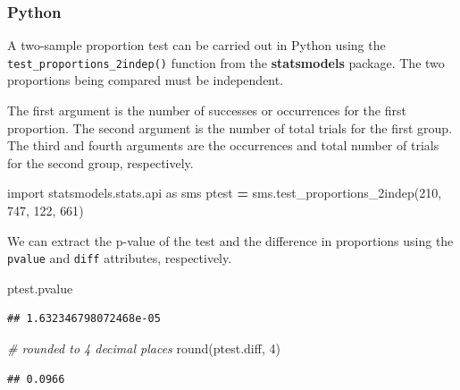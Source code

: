 \documentclass[
]{book}
\newenvironment{Shaded}{\begin{snugshade}}{\end{snugshade}}
\newcommand{\BuiltInTok}[1]{#1}
\newcommand{\CommentTok}[1]{\textcolor[rgb]{0.56,0.35,0.01}{\textit{#1}}}
\newcommand{\DecValTok}[1]{\textcolor[rgb]{0.00,0.00,0.81}{#1}}
\newcommand{\ImportTok}[1]{#1}
\newcommand{\NormalTok}[1]{#1}
\newcommand{\OperatorTok}[1]{\textcolor[rgb]{0.81,0.36,0.00}{\textbf{#1}}}
\begin{document}
\hypertarget{python-48}{%
\subsubsection*{Python}\label{python-48}}

A two-sample proportion test can be carried out in Python using the \texttt{test\_proportions\_2indep()} function from the \textbf{statsmodels} package. The two proportions being compared must be independent.

The first argument is the number of successes or occurrences for the first proportion. The second argument is the number of total trials for the first group. The third and fourth arguments are the occurrences and total number of trials for the second group, respectively.

\begin{Shaded}
\begin{Highlighting}[]
\ImportTok{import}\NormalTok{ statsmodels.stats.api }\ImportTok{as}\NormalTok{ sms}
\NormalTok{ptest }\OperatorTok{=}\NormalTok{ sms.test\_proportions\_2indep(}\DecValTok{210}\NormalTok{, }\DecValTok{747}\NormalTok{, }\DecValTok{122}\NormalTok{, }\DecValTok{661}\NormalTok{)}
\end{Highlighting}
\end{Shaded}

We can extract the p-value of the test and the difference in proportions using the \texttt{pvalue} and \texttt{diff} attributes, respectively.

\begin{Shaded}
\begin{Highlighting}[]
\NormalTok{ptest.pvalue}
\end{Highlighting}
\end{Shaded}

\begin{verbatim}
## 1.632346798072468e-05
\end{verbatim}

\begin{Shaded}
\begin{Highlighting}[]
\CommentTok{\# rounded to 4 decimal places}
\BuiltInTok{round}\NormalTok{(ptest.diff, }\DecValTok{4}\NormalTok{)}
\end{Highlighting}
\end{Shaded}

\begin{verbatim}
## 0.0966
\end{verbatim}
\end{document}

